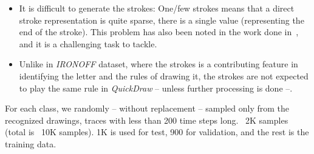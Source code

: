 \begin{itemize}
    \item It is difficult to generate the strokes: One/few strokes means that a direct stroke representation is quite sparse, there is a single value (representing the end of the stroke). This problem has also been noted in the work done in~\citep{ha2017neural}, and it is a challenging task to tackle.
    \item Unlike in \textit{IRONOFF} dataset, where the strokes is a contributing feature in identifying the letter and the rules of drawing it, the strokes are not expected to play the same rule in \textit{QuickDraw} -- unless further processing is done --.
\end{itemize}

\par For each class, we randomly -- without replacement -- sampled only from the recognized drawings, traces with less than 200 time steps long. ~2K samples (total is ~10K samples). 1K is used for test, 900 for validation, and the rest is the training data.

